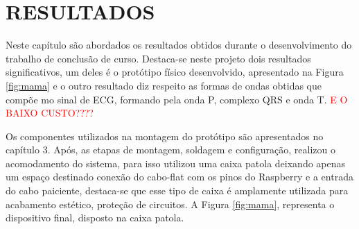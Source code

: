 \newpage

\section{RESULTADOS}

\hspace*{0.8cm} Neste capítulo são abordados os resultados obtidos durante o desenvolvimento do trabalho de conclusão de curso. Destaca-se neste projeto dois resultados significativos, um deles é o protótipo físico desenvolvido, apresentado na Figura \ref{fig:mama} e o outro resultado diz respeito as formas de ondas obtidas que compõe mo sinal de ECG, formando pela onda P, complexo QRS e onda T. \textcolor{red}{E O BAIXO CUSTO????}

Os componentes utilizados na montagem do protótipo são apresentados no capítulo 3. Após, as etapas de montagem, soldagem e configuração, realizou o acomodamento do sistema, para isso utilizou uma caixa patola deixando apenas um espaço destinado conexão do cabo-flat com os pinos do Raspberry e a entrada do cabo paiciente, destaca-se que esse tipo de caixa é amplamente utilizada para acabamento estético, proteção de circuitos. A Figura \ref{fig:mama}, representa o dispositivo final, disposto na caixa patola.




